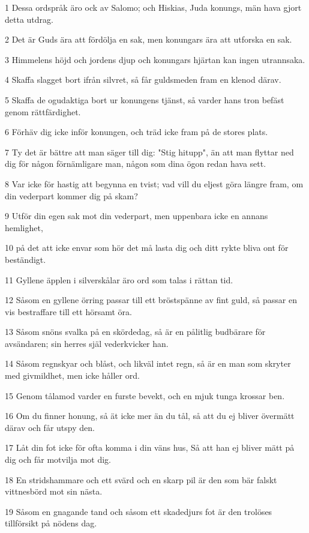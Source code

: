 \par 1 Dessa ordspråk äro ock av Salomo; och Hiskias, Juda konungs, män hava gjort detta utdrag.
\par 2 Det är Guds ära att fördölja en sak, men konungars ära att utforska en sak.
\par 3 Himmelens höjd och jordens djup och konungars hjärtan kan ingen utrannsaka.
\par 4 Skaffa slagget bort ifrån silvret, så får guldsmeden fram en klenod därav.
\par 5 Skaffa de ogudaktiga bort ur konungens tjänst, så varder hans tron befäst genom rättfärdighet.
\par 6 Förhäv dig icke inför konungen, och träd icke fram på de stores plats.
\par 7 Ty det är bättre att man säger till dig: "Stig hitupp", än att man flyttar ned dig för någon förnämligare man, någon som dina ögon redan hava sett.
\par 8 Var icke för hastig att begynna en tvist; vad vill du eljest göra längre fram, om din vederpart kommer dig på skam?
\par 9 Utför din egen sak mot din vederpart, men uppenbara icke en annans hemlighet,
\par 10 på det att icke envar som hör det må lasta dig och ditt rykte bliva ont för beständigt.
\par 11 Gyllene äpplen i silverskålar äro ord som talas i rättan tid.
\par 12 Såsom en gyllene örring passar till ett bröstspänne av fint guld, så passar en vis bestraffare till ett hörsamt öra.
\par 13 Såsom snöns svalka på en skördedag, så är en pålitlig budbärare för avsändaren; sin herres själ vederkvicker han.
\par 14 Såsom regnskyar och blåst, och likväl intet regn, så är en man som skryter med givmildhet, men icke håller ord.
\par 15 Genom tålamod varder en furste bevekt, och en mjuk tunga krossar ben.
\par 16 Om du finner honung, så ät icke mer än du tål, så att du ej bliver övermätt därav och får utspy den.
\par 17 Låt din fot icke för ofta komma i din väns hus, Så att han ej bliver mätt på dig och får motvilja mot dig.
\par 18 En stridshammare och ett svärd och en skarp pil är den som bär falskt vittnesbörd mot sin nästa.
\par 19 Såsom en gnagande tand och såsom ett skadedjurs fot är den trolöses tillförsikt på nödens dag.
